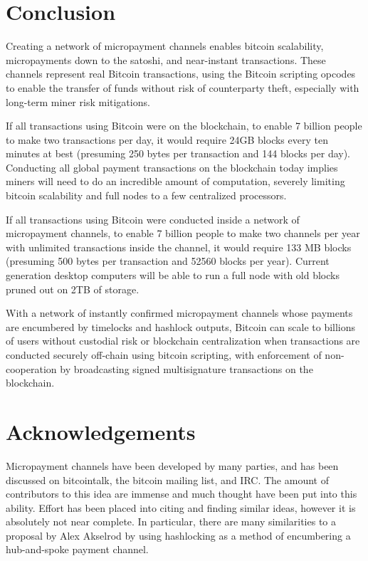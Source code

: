 \documentclass[letterpaper,11pt]{article}
\begin{document}
\section{Conclusion}

Creating a network of micropayment channels enables bitcoin scalability,
micropayments down to the satoshi, and near-instant transactions. These channels
represent real Bitcoin transactions, using the Bitcoin scripting opcodes to
enable the transfer of funds without risk of counterparty theft, especially with
long-term miner risk mitigations.

If all transactions using Bitcoin were on the blockchain, to enable 7 billion
people to make two transactions per day, it would require 24GB blocks every ten
minutes at best (presuming 250 bytes per transaction and 144 blocks per day).
Conducting all global payment transactions on the blockchain today implies
miners will need to do an incredible amount of computation, severely limiting
bitcoin scalability and full nodes to a few centralized processors.

If all transactions using Bitcoin were conducted inside a network of
micropayment channels, to enable 7 billion people to make two channels per year
with unlimited transactions inside the channel, it would require 133 MB blocks
(presuming 500 bytes per transaction and 52560 blocks per year). Current
generation desktop computers will be able to run a full node with old blocks
pruned out on 2TB of storage.

With a network of instantly confirmed micropayment channels whose payments are
encumbered by timelocks and hashlock outputs, Bitcoin can scale to billions of
users without custodial risk or blockchain centralization when transactions are
conducted securely off-chain using bitcoin scripting, with enforcement of
non-cooperation by broadcasting signed multisignature transactions on the
blockchain.

\section{Acknowledgements}

Micropayment channels have been developed by many parties, and has been
discussed on bitcointalk, the bitcoin mailing list, and IRC. The amount of
contributors to this idea are immense and much thought have been put into this
ability. Effort has been placed into citing and finding similar ideas, however
it is absolutely not near complete. In particular, there are many similarities
to a proposal by Alex Akselrod by using hashlocking as a method of encumbering a
hub-and-spoke payment channel.
\end{document}
